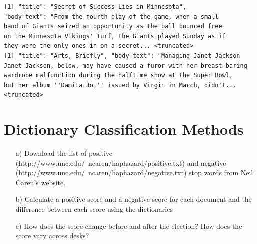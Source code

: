 \documentclass[12pt,letterpaper]{article}
\begin{document}
  

\begin{Verbatim}[fontsize=\small]
[1] "title": "Secret of Success Lies in Minnesota",
"body_text": "From the fourth play of the game, when a small 
band of Giants seized an opportunity as the ball bounced free 
on the Minnesota Vikings' turf, the Giants played Sunday as if 
they were the only ones in on a secret... <truncated>
[1] "title": "Arts, Briefly", "body_text": "Managing Janet Jackson
Janet Jackson, below, may have caused a furor with her breast-baring
wardrobe malfunction during the halftime show at the Super Bowl,
but her album ''Damita Jo,'' issued by Virgin in March, didn't... <truncated>
\end{Verbatim}

\section{Dictionary Classification Methods}
\begin{itemize}
\item[a)] Download the list of positive (http://www.unc.edu/~ncaren/haphazard/positive.txt) and negative (http://www.unc.edu/~ncaren/haphazard/negative.txt) stop words from Neil Caren's website.
\item[b)] Calculate a positive score and a negative score for each document and the difference between each score using the dictionaries
\end{itemize}



\begin{itemize}
\item[c)] How does the score change before and after the election?  How does the score vary across desks?
\end{itemize}

  
\end{document}
